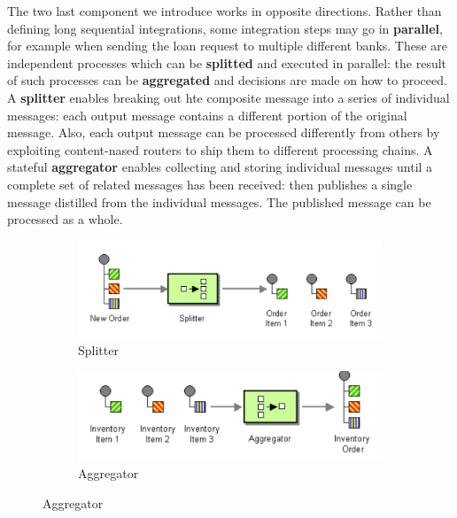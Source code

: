 \documentclass[10pt,a4paper]{report}
\begin{document}
The two last component we introduce works in opposite directions. Rather than defining long sequential integrations, some integration steps may go in \textbf{parallel}, for example when sending the loan request to multiple different banks. These are independent processes which can be \textbf{splitted} and executed in parallel: the result of such processes can be \textbf{aggregated} and decisions are made on how to proceed.
A \textbf{splitter} enables breaking out hte composite message into a series of individual messages: each output message contains a different portion of the original message. Also, each output message can be processed differently from others by exploiting content-nased routers to ship them to different processing chains. 
A stateful \textbf{aggregator} enables collecting and storing individual messages until a complete set of related messages has been received: then publishes a single message distilled from the individual messages. The published message can be processed as a whole.  

\begin{figure}
	\centering
	\begin{subfigure}{.5\textwidth}
		\centering
		\includegraphics[width=.9\linewidth]{image48}
		\caption{Splitter}
		\label{image48}
	\end{subfigure}%
	\begin{subfigure}{.5\textwidth}
		\centering
		\includegraphics[width=.9\linewidth]{image49}
		\caption{Aggregator}
		\label{image49}
	\end{subfigure}
	
	\label{image49a}
\end{figure}
\end{document}
